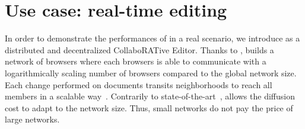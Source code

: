
\section{Use case: real-time editing}
\label{sec:use-case}




In order to demonstrate the performances of \SPRAY in a real scenario,
we introduce \CRATE as a distributed and decentralized CollaboRATive
Editor. Thanks to \SPRAY, \CRATE builds a network of
browsers where each browsers is able to communicate with a
logarithmically scaling number of browsers compared to the global
network size. Each change performed on documents transits
neighborhoods to reach all members in a scalable
way~\cite{birman1999bimodal}. Contrarily to
state-of-the-art~\cite{tolgyeski2009adaptive, voulgaris2005cyclon},
\SPRAY allows the diffusion cost to adapt to the network size. Thus,
small networks do not pay the price of large networks.

